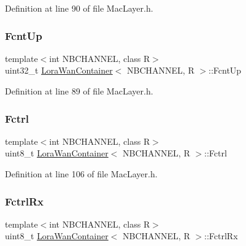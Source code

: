 Definition at line 90 of file Mac\+Layer.\+h.

\mbox{\label{class_lora_wan_container_a57741eeabfb00a58e90368f2134ce7f8}} 
\subsubsection{\texorpdfstring{Fcnt\+Up}{FcntUp}}
{\footnotesize\ttfamily template$<$int N\+B\+C\+H\+A\+N\+N\+EL, class R$>$ \\
uint32\+\_\+t \mbox{\hyperlink{class_lora_wan_container}{Lora\+Wan\+Container}}$<$ N\+B\+C\+H\+A\+N\+N\+EL, R $>$\+::Fcnt\+Up}



Definition at line 89 of file Mac\+Layer.\+h.

\mbox{\label{class_lora_wan_container_a4892444ed5c7fa20cbf9c45a5da7ed22}} 
\subsubsection{\texorpdfstring{Fctrl}{Fctrl}}
{\footnotesize\ttfamily template$<$int N\+B\+C\+H\+A\+N\+N\+EL, class R$>$ \\
uint8\+\_\+t \mbox{\hyperlink{class_lora_wan_container}{Lora\+Wan\+Container}}$<$ N\+B\+C\+H\+A\+N\+N\+EL, R $>$\+::Fctrl}



Definition at line 106 of file Mac\+Layer.\+h.

\mbox{\label{class_lora_wan_container_adeacbc1d6a4a97256e0e35e9c72799f6}} 
\subsubsection{\texorpdfstring{Fctrl\+Rx}{FctrlRx}}
{\footnotesize\ttfamily template$<$int N\+B\+C\+H\+A\+N\+N\+EL, class R$>$ \\
uint8\+\_\+t \mbox{\hyperlink{class_lora_wan_container}{Lora\+Wan\+Container}}$<$ N\+B\+C\+H\+A\+N\+N\+EL, R $>$\+::Fctrl\+Rx}



